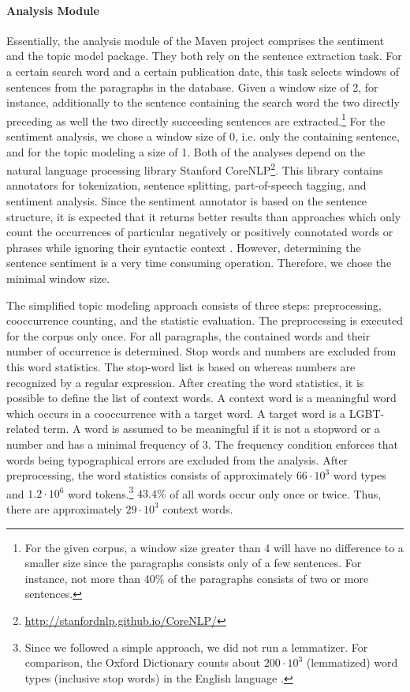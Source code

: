 \documentclass[10pt,a4paper,twocolumn]{scrartcl}
\begin{document}
\paragraph*{Analysis Module} Essentially, the analysis module of the Maven project comprises the sentiment and the topic model package. They both rely on the sentence extraction task. For a certain search word and a certain publication date, this task selects windows of sentences from the paragraphs in the database. Given a window size of 2, for instance, additionally to the sentence containing the search word the two directly preceding as well the two directly succeeding sentences are extracted.\footnote{For the given corpus, a window size greater than 4 will have no difference to a smaller size since the paragraphs consists only of a few sentences. For instance, not more than 40\% of the paragraphs consists of two or more sentences.} For the sentiment analysis, we chose a window size of 0, i.e. only the containing sentence, and for the topic modeling a size of 1.  Both of the analyses depend on the natural language processing library Stanford CoreNLP\footnote{\url{http://stanfordnlp.github.io/CoreNLP/}}. This library contains annotators for tokenization, sentence splitting, part-of-speech tagging, and sentiment analysis. Since the sentiment annotator is based on the sentence structure, it is expected that it returns better results than approaches which only count the occurrences of particular negatively or positively connotated words or phrases while ignoring their syntactic context \citep{Socher+al:2013}. However, determining the sentence sentiment is a very time consuming operation. Therefore, we chose the minimal window size.

The simplified topic modeling approach consists of three steps: preprocessing, cooccurrence counting, and the statistic evaluation. The preprocessing is executed for the corpus only once. For all paragraphs, the contained words and their number of occurrence is determined. Stop words and numbers are excluded from this word statistics. The stop-word list is based on \citep[p.533]{Manning+Schuetze:2003} whereas numbers are recognized by a regular expression. After creating the word statistics, it is possible to define the list of context words. A context word is a meaningful word which occurs in a cooccurrence with a target word. A target word is a LGBT-related term. A word is assumed to be meaningful if it is not a stopword or a number and has a minimal frequency of 3. The frequency condition enforces that words being typographical errors are excluded from the analysis. After preprocessing, the word statistics consists of approximately $66\cdot 10^3$ word types and $1.2 \cdot 10^6$ word tokens.\footnote{Since we followed a simple approach, we did not run a lemmatizer. For comparison, the Oxford Dictionary counts about $200 \cdot 10^3$ (lemmatized) word types (inclusive stop words) in the English language \citep{Oxford}.}  $43.4\%$ of all words occur only once or twice. Thus, there are approximately $29\cdot 10^3$ context words.
\end{document}
